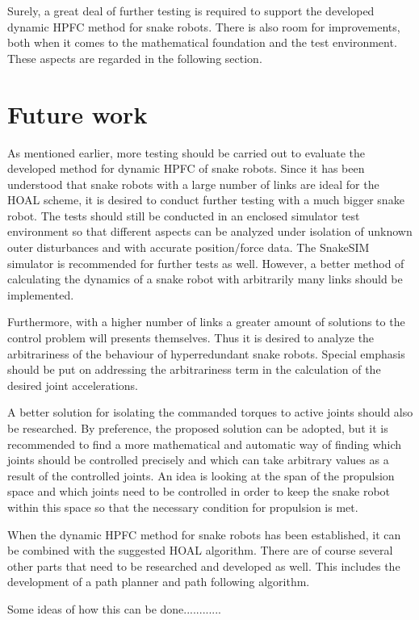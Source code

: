 Surely, a great deal of further testing is required to support the developed dynamic HPFC method for snake robots. There is also room for improvements, both when it comes to the mathematical foundation and the test environment. These aspects are regarded in the following section.

\section{Future work}

As mentioned earlier, more testing should be carried out to evaluate the developed method for dynamic HPFC of snake robots. Since it has been understood that snake robots with a large number of links are ideal for the HOAL scheme, it is desired to conduct further testing with a much bigger snake robot. The tests should still be conducted in an enclosed simulator test environment so that different aspects can be analyzed under isolation of unknown outer disturbances and with accurate position/force data. The SnakeSIM simulator is recommended for further tests as well. However, a better method of calculating the dynamics of a snake robot with arbitrarily many links should be implemented.

Furthermore, with a higher number of links a greater amount of solutions to the control problem will presents themselves. Thus it is desired to analyze the arbitrariness of the behaviour of hyperredundant snake robots. Special emphasis should be put on addressing the arbitrariness term in the calculation of the desired joint accelerations.

A better solution for isolating the commanded torques to active joints should also be researched. By preference, the proposed solution can be adopted, but it is recommended to find a more mathematical and automatic way of finding which joints should be controlled precisely and which can take arbitrary values as a result of the controlled joints. An idea is looking at the span of the propulsion space and which joints need to be controlled in order to keep the snake robot within this space so that the necessary condition for propulsion is met.

When the dynamic HPFC method for snake robots has been established, it can be combined with the suggested HOAL algorithm. There are of course several other parts that need to be researched and developed as well. This includes the development of a path planner and path following algorithm.

Some ideas of how this can be done............